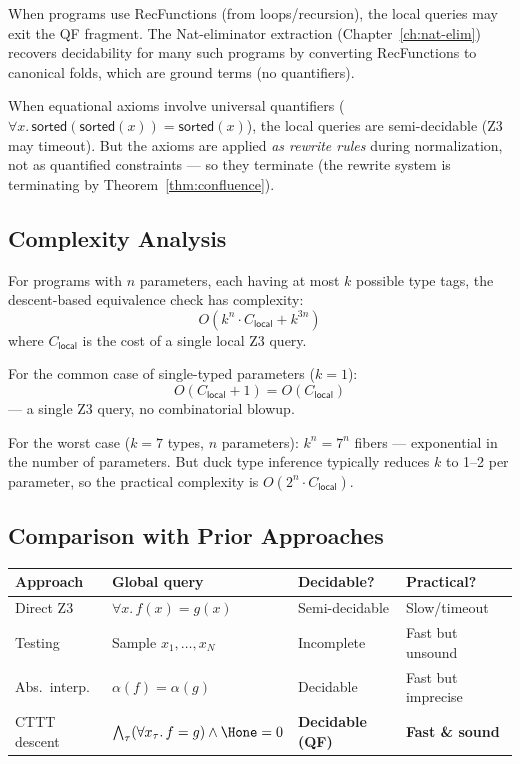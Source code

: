 \begin{remark}
When programs use RecFunctions (from loops/recursion), the local
queries may exit the QF fragment.  The Nat-eliminator extraction
(Chapter~\ref{ch:nat-elim}) recovers decidability for many such
programs by converting RecFunctions to canonical folds, which are
ground terms (no quantifiers).

When equational axioms involve universal quantifiers ($\forall x.\,
\mathsf{sorted}(\mathsf{sorted}(x)) = \mathsf{sorted}(x)$), the
local queries are semi-decidable (Z3 may timeout).  But the axioms
are applied \emph{as rewrite rules} during normalization, not as
quantified constraints --- so they terminate (the rewrite system is
terminating by Theorem~\ref{thm:confluence}).
\end{remark}

\subsection{Complexity Analysis}

\begin{theorem}
\label{thm:descent-complexity}
For programs with $n$ parameters, each having at most $k$ possible
type tags, the descent-based equivalence check has complexity:
\[
  O(k^n \cdot C_\mathsf{local} + k^{3n})
\]
where $C_\mathsf{local}$ is the cost of a single local Z3 query.

For the common case of single-typed parameters ($k = 1$):
\[
  O(C_\mathsf{local} + 1) = O(C_\mathsf{local})
\]
--- a single Z3 query, no combinatorial blowup.

For the worst case ($k = 7$ types, $n$ parameters):
$k^n = 7^n$ fibers --- exponential in the number of parameters.
But duck type inference typically reduces $k$ to 1--2 per parameter,
so the practical complexity is $O(2^n \cdot C_\mathsf{local})$.
\end{theorem}

\subsection{Comparison with Prior Approaches}

\begin{center}
\small
\begin{tabular}{l l l l}
  \textbf{Approach} & \textbf{Global query} & \textbf{Decidable?} &
  \textbf{Practical?} \\
  \hline
  Direct Z3 & $\forall x.\, f(x) = g(x)$ & Semi-decidable &
    Slow/timeout \\
  Testing & Sample $x_1, \ldots, x_N$ & Incomplete &
    Fast but unsound \\
  Abs.\ interp. & $\alpha(f) = \alpha(g)$ & Decidable &
    Fast but imprecise \\
  CTTT descent & $\bigwedge_\tau (\forall x_\tau.\, f = g) \land
    \Hone = 0$ & \textbf{Decidable (QF)} & \textbf{Fast \& sound} \\
\end{tabular}
\end{center}

